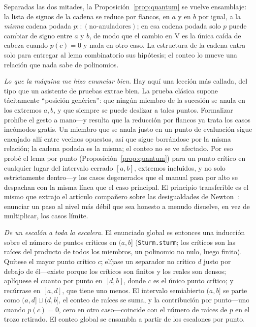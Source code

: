 \documentclass[11pt]{article}
\newcommand{\lean}[1]{\texttt{#1}}
\newcommand{\V}{\mathrm{V}}
\begin{document}
Separadas las dos mitades, la Proposici\'on~\ref{prop:quantum} se vuelve ensamblaje: la lista de
signos de la cadena se reduce por flancos, en $a$ y en $b$ por igual, a la \emph{misma} cadena podada
$p\mathbin{:\!:}(\text{no-anuladores})$; en esa cadena podada solo $p$ puede cambiar de signo entre
$a$ y $b$, de modo que el cambio en $\V$ es la \'unica ca\'ida de cabeza cuando $p(c)=0$ y nada en
otro caso. La estructura de la cadena entra solo para entregar al lema combinatorio sus hip\'otesis;
el conteo lo mueve una relaci\'on que nada sabe de polinomios.

\emph{Lo que la m\'aquina me hizo enunciar bien.} Hay aqu\'i una lecci\'on m\'as callada, del tipo
que un asistente de pruebas extrae bien. La prueba cl\'asica supone t\'acitamente ``posici\'on
gen\'erica'': que ning\'un miembro de la sucesi\'on se anula en los extremos $a,b$, y que siempre se
puede deslizar a tales puntos. Formalizar proh\'ibe el gesto a mano---y resulta que la reducci\'on por
flancos ya trata los casos inc\'omodos gratis. Un miembro que se anula justo en un punto de
evaluaci\'on sigue encajado all\'i entre vecinos opuestos, as\'i que sigue borr\'andose por la misma
relaci\'on; la cadena podada es la misma; el conteo no se ve afectado. Por eso prob\'e el lema por
punto (Proposici\'on~\ref{prop:quantum}) para un punto cr\'itico en cualquier lugar del intervalo
cerrado $[a,b]$, extremos incluidos, y no solo estrictamente dentro---y los casos degenerados que el
manual pasa por alto se despachan con la misma l\'inea que el caso principal. El principio
transferible es el mismo que extrajo el art\'iculo compa\~nero sobre las desigualdades de
Newton~\cite{newton}: enunciar un paso al nivel m\'as d\'ebil que sea honesto a menudo disuelve, en
vez de multiplicar, los casos l\'imite.

\emph{De un escal\'on a toda la escalera.} El enunciado global es entonces una inducci\'on sobre el
n\'umero de puntos cr\'iticos en $(a,b]$ (\lean{Sturm.sturm}; los cr\'iticos son las ra\'ices del
producto de todos los miembros, un polinomio no nulo, luego finito). Qu\'itese el mayor punto cr\'itico
$c$; el\'ijase un separador no cr\'itico $d$ justo por debajo de \'el---existe porque los cr\'iticos
son finitos y los reales son densos; apl\'iquese el cuanto por punto en $[d,b]$, donde $c$ es el
\'unico punto cr\'itico; y rec\'urrase en $[a,d]$, que tiene uno menos. El intervalo semiabierto
$(a,b]$ se parte como $(a,d]\sqcup(d,b]$, el conteo de ra\'ices se suma, y la contribuci\'on por
punto---uno cuando $p(c)=0$, cero en otro caso---coincide con el n\'umero de ra\'ices de $p$ en el
trozo retirado. El conteo global se ensambla a partir de los escalones por punto.
\end{document}
